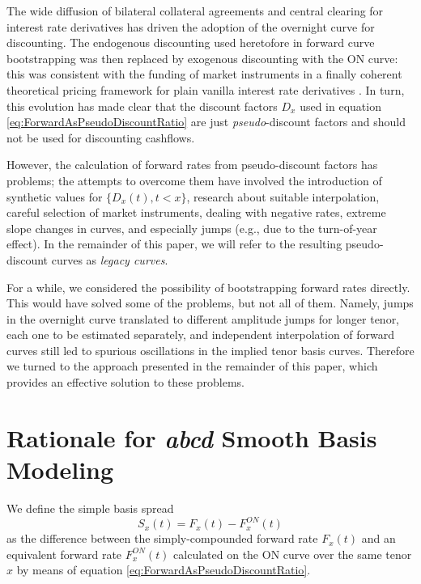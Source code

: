 \documentclass{article}
\begin{document}
The wide diffusion of bilateral collateral agreements and central clearing for interest rate derivatives has driven the adoption of the overnight curve for  discounting. The endogenous discounting used heretofore in forward curve bootstrapping was then replaced by exogenous discounting with the ON curve: this was consistent with the funding of market instruments in a finally coherent theoretical pricing framework for plain vanilla interest rate derivatives \cite{piterbarg, ametrano-bianchetti-2, mercurio}. In turn, this evolution has made clear that the discount factors $D_x$ used in equation \ref{eq:ForwardAsPseudoDiscountRatio} are just \textit{pseudo}-discount factors and should not be used for discounting cashflows.


However, the calculation of forward rates from pseudo-discount factors has problems; the attempts to overcome them \cite{ametrano-mazzocchi, hagan, andreasen, ametrano-bianchetti-2, Burkard} have involved the introduction of synthetic values for $\{D_x(t), t<x \}$, research about suitable interpolation, careful selection of market instruments, dealing with negative rates, extreme slope changes in curves, and especially jumps (e.g., due to the turn-of-year effect). In the remainder of this paper, we will refer to the resulting pseudo-discount curves as \textit{legacy curves}.

For a while, we considered the possibility of bootstrapping forward rates directly. This would have solved some of the problems, but not all of them. Namely, jumps in the overnight curve translated to different amplitude jumps for longer tenor, each one to be estimated separately, and independent interpolation of forward curves still led to spurious oscillations in the implied tenor basis curves. Therefore we turned to the approach presented in the remainder of this paper, which provides an effective solution to these problems.








\section{Rationale for \textit{abcd} Smooth Basis Modeling}

We define the simple basis spread
\begin{equation}
\label{eq:S_x}
S_x(t) = F_x(t) - F_x^{ON}(t)
\end{equation}
as the difference between the simply-compounded forward rate $F_{x}(t)$ and an equivalent forward rate $F_{x}^{ON}(t)$ calculated on the ON curve over the same tenor $x$ by means of equation \ref{eq:ForwardAsPseudoDiscountRatio}.
\end{document}
